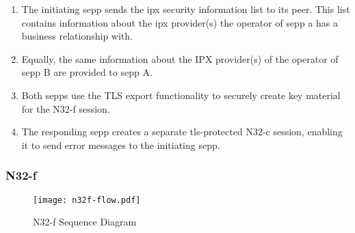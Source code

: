 \begin{enumerate}[wide, labelwidth=!, labelindent=0pt]
    \item The initiating \gls{sepp} sends the \gls{ipx} security information list to its peer. This list contains information about the \gls{ipx} provider(s) the operator of \gls{sepp} a has a business relationship with.
    \item Equally, the same information about the IPX provider(s) of the operator of \gls{sepp} B are provided to \gls{sepp} A.
    \item Both \glspl{sepp} use the TLS export functionality to securely create key material for the N32-f session.
    \item The responding \gls{sepp} creates a separate \gls{tls}-protected N32-c session, enabling it to send error messages to the initiating \gls{sepp}.
\end{enumerate}

\subsubsection{N32-f}

\begin{figure}[h!]
    \centering
    \texttt{[image: n32f-flow.pdf]}
    \caption{N32-f Sequence Diagram}
    \label{fig:n32f-sequence}
\end{figure}

